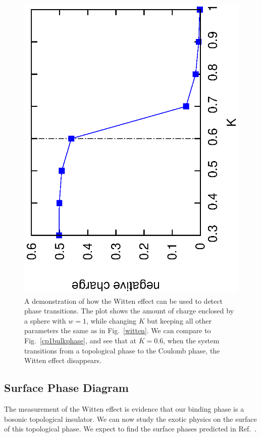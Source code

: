 \documentclass[prb,twocolumn]{revtex4-1}
\newcommand{\scripty}[1]{w}
\begin{document}
\begin{figure}
\includegraphics[angle=-90,width=0.9\linewidth]{figures/wittenphase.eps}
\caption{A demonstration of how the Witten effect can be used to detect phase transitions. The plot shows the amount of charge enclosed by a sphere with $\scripty{r}=1$, while changing $K$ but keeping all other parameters the same as in Fig.~\ref{witten}. We can compare to Fig.~\ref{cp1bulkphase}, and see that at $K=0.6$, when the system transitions from a topological phase to the Coulomb phase, the Witten effect disappears.}
\label{wittenphase}
\end{figure}


\subsection{Surface Phase Diagram}

The measurement of the Witten effect is evidence that our binding phase is a bosonic topological insulator. We can now study the exotic physics on the surface of this topological phase. We expect to find the surface phases predicted in Ref.~.
\end{document}
